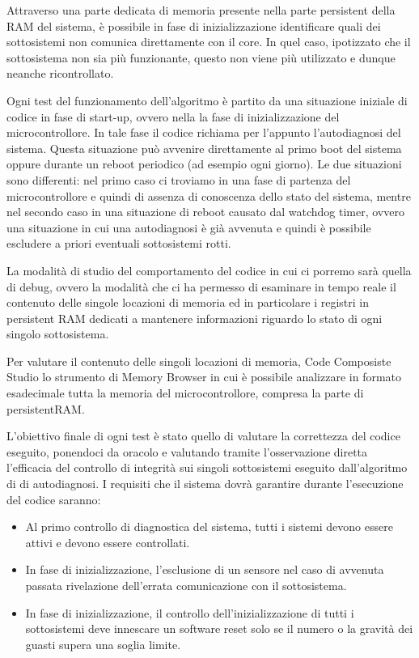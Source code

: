 \documentclass[LaM,binding=0.6cm]{../sapthesis}
\begin{document}
Attraverso una parte dedicata di memoria presente nella parte persistent della RAM del sistema, è possibile in fase di inizializzazione identificare quali dei sottosistemi non comunica direttamente con il core. In quel caso, ipotizzato che il sottosistema non sia più funzionante, questo non viene più utilizzato e dunque neanche ricontrollato.

Ogni test del funzionamento dell'algoritmo è partito da una situazione iniziale di codice in fase di start-up, ovvero nella la fase di inizializzazione del microcontrollore. In tale fase il codice richiama per l'appunto l'autodiagnosi del sistema. Questa situazione può avvenire direttamente al primo boot del sistema oppure durante un reboot periodico (ad esempio ogni giorno). Le due situazioni sono differenti: nel primo caso ci troviamo in una fase di partenza del microcontrollore e quindi di assenza di conoscenza dello stato del sistema, mentre nel secondo caso in una situazione di reboot causato dal watchdog timer, ovvero una situazione in cui una autodiagnosi è già avvenuta e quindi è possibile escludere a priori eventuali sottosistemi rotti.

La modalità di studio del comportamento del codice in cui ci porremo sarà quella di debug, ovvero la modalità che ci ha permesso di esaminare in tempo reale il contenuto delle singole locazioni di memoria ed in particolare i registri in persistent RAM dedicati a mantenere informazioni riguardo lo stato di ogni singolo sottosistema.

Per valutare il contenuto delle singoli locazioni di memoria, Code Composiste Studio lo strumento di Memory Browser in cui è possibile analizzare in formato esadecimale tutta la memoria del microcontrollore, compresa la parte di persistentRAM.

L'obiettivo finale di ogni test è stato quello di valutare la correttezza del codice eseguito, ponendoci da oracolo e valutando tramite l'osservazione diretta l'efficacia del controllo di integrità sui singoli sottosistemi eseguito dall'algoritmo di di autodiagnosi.\newline\newline
I requisiti che il sistema dovrà garantire durante l'esecuzione del codice saranno:
\begin{itemize}

    \item Al primo controllo di diagnostica del sistema, tutti i sistemi devono essere attivi e devono essere controllati.
    
    \item  In fase di inizializzazione, l'esclusione di un sensore nel caso di avvenuta passata rivelazione dell'errata comunicazione con il sottosistema.
    
    \item In fase di inizializzazione, il controllo dell'inizializzazione di tutti i sottosistemi deve innescare un software reset solo se il numero o la gravità dei guasti supera una soglia limite.
    
\end{itemize}
\end{document}
